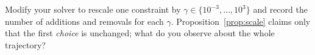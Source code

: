 \begin{exercises}
\begin{exercise}[Implementation]
Modify your solver to rescale one constraint by $\gamma \in \{10^{-3},\dots,10^{3}\}$
and record the number of additions and removals for each $\gamma$.
Proposition~\ref{prop:scale} claims only that the first \emph{choice} is unchanged;
what do you observe about the whole trajectory?
\end{exercise}

\end{exercises}
